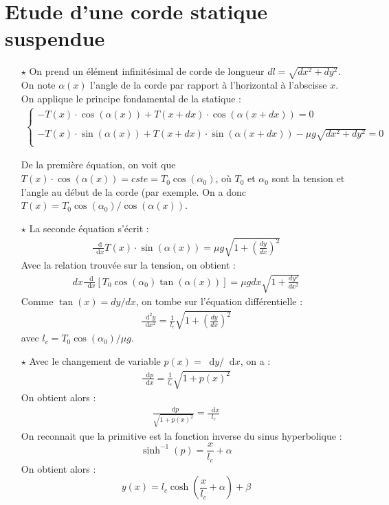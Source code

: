 \documentclass{report}
\newcommand*\dif{\mathop{}\!\mathrm{d}}
\begin{document}
\section*{Etude d'une corde statique suspendue}

\begin{itemize}

	\item[$\star$] On prend un élément infinitésimal de corde de longueur $dl=\sqrt{dx^2+dy^2}$. On note $\alpha(x)$ l'angle de la corde par rapport à l'horizontal à l'abscisse $x$. On applique le principe fondamental de la statique :
	\begin{align*}
	\left\lbrace
	\begin{array}{ccc}
	-T(x)\cdot\cos(\alpha(x))+T(x+dx)\cdot\cos(\alpha(x+dx))=0\\
	\\
	-T(x)\cdot\sin(\alpha(x))+T(x+dx)\cdot\sin(\alpha(x+dx))-\mu g\sqrt{dx^2+dy^2}=0\\
	\end{array}\right.
	\end{align*}		
	
	De la première équation, on voit que $T(x)\cdot\cos(\alpha(x))=cste=T_0\cos(\alpha_0)$, où $T_0$ et $\alpha_0$ sont la tension et l'angle au début de la corde (par exemple. On a donc $T(x)=T_0\cos(\alpha_0)/\cos(\alpha(x))$.
	
	\item[$\star$] La seconde équation s'écrit :
	\begin{align*}
		\frac{\dif }{\dif x}T(x)\cdot\sin(\alpha(x))=\mu g \sqrt{1+\left( \frac{dy}{dx}\right)^2}
	\end{align*}
	Avec la relation trouvée sur la tension, on obtient :
	\begin{align*}
		dx\frac{\dif }{\dif x}\left[T_0\cos(\alpha_0)\tan(\alpha(x))\right] =\mu g dx\sqrt{1+\frac{dy^2}{dx^2}}
	\end{align*}
	Comme $\tan(x)=dy/dx$, on tombe sur l'équation différentielle :
	\begin{align*}
		\frac{\dif^2 y}{\dif x^2} =\frac{1}{l_c}\sqrt{1+\left( \frac{dy}{dx}\right)^2}
	\end{align*}	
	avec $l_c=T_0\cos(\alpha_0)/\mu g$.
	
	\item[$\star$] Avec le changement de variable $p(x)=\dif y/\dif x$, on a :
	\begin{align*}
		\frac{\dif p}{\dif x} =\frac{1}{l_c}\sqrt{1+p(x)^2}
	\end{align*}	
	On obtient alors :
	\begin{align*}
		\frac{\dif p}{\sqrt{1+p(x)^2}} =\frac{\dif x}{l_c}
	\end{align*}	
	On reconnait que la primitive est la fonction inverse du sinus hyperbolique :
	\begin{equation}
		\sinh^{-1}(p)=\frac{x}{l_c} +\alpha
	\end{equation}
	On obtient alors :
	\begin{equation}
		y(x) = l_c\cosh\left( \frac{x}{l_c}+\alpha\right) +\beta
	\end{equation}
	

\end{itemize}
\end{document}
